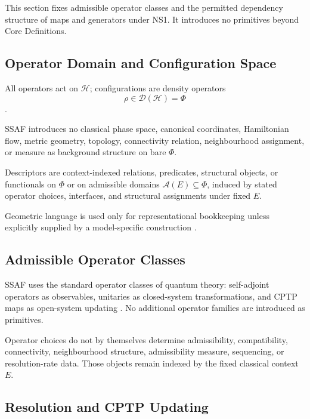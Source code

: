 \documentclass[aps,prx,onecolumn,11pt]{revtex4-2}
\theoremstyle{plain}
\theoremstyle{definition}
\theoremstyle{remark}
\begin{document}
This section fixes admissible operator classes and the permitted
dependency structure of maps and generators under NS1. It introduces no
primitives beyond Core Definitions.

\subsection{Operator Domain and Configuration Space}
\label{subsec:operator_domain}

All operators act on \(\mathcal{H}\); configurations are density
operators
\[
\rho\in\mathcal{D}(\mathcal{H})=\Phi
\]
\cite{Kraus1983,NielsenChuang2010,Watrous2018,Wilde2017}.

SSAF introduces no classical phase space, canonical coordinates,
Hamiltonian flow, metric geometry, topology, connectivity relation,
neighbourhood assignment, or measure as background structure on bare
\(\Phi\).

Descriptors are context-indexed relations, predicates, structural
objects, or functionals on \(\Phi\) or on admissible domains
\(\mathcal A(E)\subseteq\Phi\), induced by stated operator choices,
interfaces, and structural assignments under fixed \(E\).

Geometric language is used only for representational bookkeeping unless
explicitly supplied by a model-specific construction
\cite{BengtssonZyczkowski2006}.

\subsection{Admissible Operator Classes}
\label{subsec:admissible_operator_classes}

SSAF uses the standard operator classes of quantum theory:
self-adjoint operators as observables, unitaries as closed-system
transformations, and CPTP maps as open-system updating
\cite{NielsenChuang2010,Watrous2018}. No additional operator families
are introduced as primitives.

Operator choices do not by themselves determine admissibility,
compatibility, connectivity, neighbourhood structure, admissibility
measure, sequencing, or resolution-rate data. Those objects remain
indexed by the fixed classical context \(E\).

\subsection{Resolution and CPTP Updating}
\label{subsec:resolution_cptp_updating}
\end{document}
